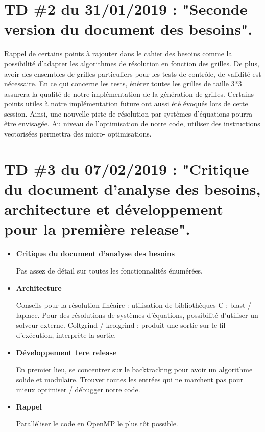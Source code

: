 \documentclass[1]{report}
\begin{document}
    \section{TD \#2 du 31/01/2019 : "Seconde version du document des besoins".}

        Rappel de certains points à rajouter dans le cahier des besoins comme la possibilité d’adapter les
        algorithmes de résolution en fonction des grilles. De plus, avoir des ensembles de grilles particuliers
        pour les tests de contrôle, de validité est nécessaire.
        En ce qui concerne les tests, énérer toutes les grilles de taille 3*3 assurera la qualité de notre
        implémentation de la génération de grilles.
        Certains points utiles à notre implémentation future ont aussi été évoqués lors de cette session.
        Ainsi, une nouvelle piste de résolution par systèmes d’équations pourra être envisagée.
        Au niveau de l’optimisation de notre code, utiliser des instructions vectorisées permettra des micro-
        optimisations.

    \section{TD \#3 du 07/02/2019 : "Critique du document d'analyse des besoins, architecture et développement pour la première release".}

        \begin{itemize}

            \item \textbf{Critique du document d'analyse des besoins}

            Pas assez de détail sur toutes les fonctionnalités énumérées.

            \item \textbf{Architecture}

            Conseils pour la résolution linéaire : utilisation de bibliothèques C : blast / laplace.
            Pour des résolutions de systèmes d’équations, possibilité d’utiliser un solveur externe.
            Coltgrind / kcolgrind : produit une sortie sur le fil d’exécution, interprète la sortie.

            \item \textbf{Développement 1ere release}

            En premier lieu, se concentrer sur le backtracking pour avoir un algorithme solide et modulaire.
            Trouver toutes les entrées qui ne marchent pas pour mieux optimiser / débugger notre code.

            \item \textbf{Rappel}
            
            Paralléliser le code en OpenMP le plus tôt possible.

        \end{itemize}
\end{document}
